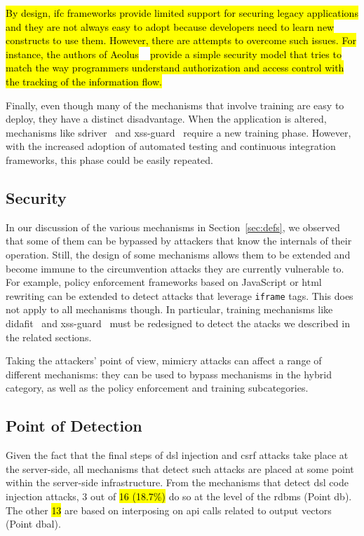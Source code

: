 \documentclass[10pt,journal,compsoc]{IEEEtran}
\newcommand{\hlc}[2][yellow]{ {\sethlcolor{#1} \hl{#2}} }
\begin{document}
\hlc[yellow]{
By design,
{\sc ifc} frameworks provide
limited support for securing legacy applications
and they are not always easy to adopt
because developers need to learn new constructs
to use them.
However,
there are attempts to overcome such issues.
For instance,
the authors of
Aeolus}~\cite{CPSPBCCSL12}
\hlc[yellow]{provide a simple security model
that tries to match the way programmers understand
authorization and access control
with the tracking of the information flow.}

Finally, even though many of the mechanisms that involve
training are easy to deploy, they have a distinct disadvantage.
When the application is altered, mechanisms like
{\sc sd}river~\cite{MS09}
and {\sc xss-guard}~\cite{BV08} require a new training phase.
However, with the increased adoption of automated testing
and continuous integration frameworks, this phase could be
easily repeated.

\subsection{Security}

In our discussion of the various mechanisms in Section~\ref{sec:defs}, we
observed that some of them can be bypassed by attackers that know
the internals of their operation.
Still, the design of some mechanisms allows them to
be extended and become immune to the circumvention attacks they are
currently vulnerable to. For example, policy enforcement frameworks
based on JavaScript or {\sc html} rewriting can be extended
to detect attacks that leverage {\tt iframe} tags. This does not apply
to all mechanisms though. In particular, training mechanisms like {\sc
  didafit}~\cite{LLW02} and {\sc xss-guard}~\cite{BV08} must be
redesigned to detect the atacks we described in the related sections.

Taking the attackers' point of view, mimicry attacks can affect a
range of different mechanisms: they can be used to bypass mechanisms
in the hybrid category, as well as the policy enforcement and training
subcategories.

\subsection{Point of Detection}

Given the fact that the final steps of
{\sc dsl} injection and {\sc csrf} attacks take place
at the server-side, all mechanisms that detect
such attacks are placed at some point within the server-side infrastructure.
From the mechanisms that detect {\sc dsl} code injection
attacks, 3 out of \hlc[yellow]{16 (18.7\%)} do so at the level
of the {\sc rdbms} (Point {\sc db}).
The other \hlc[yellow]{13} are based on interposing on {\sc api} calls related to output
vectors (Point {\sc dbal}).
\end{document}
